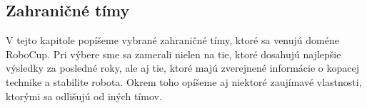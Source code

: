 \subsection{Zahraničné tímy}

V tejto kapitole popíšeme vybrané zahraničné tímy, ktoré sa venujú doméne RoboCup. Pri výbere sme sa zamerali nielen na tie, ktoré dosahujú najlepšie výsledky za posledné roky, ale aj tie, ktoré majú zverejnené informácie o kopacej technike a stabilite robota. Okrem toho opíšeme aj niektoré zaujímavé vlastnosti, ktorými sa odlišujú od iných tímov.


%
%


%
%


%
%


%
%
